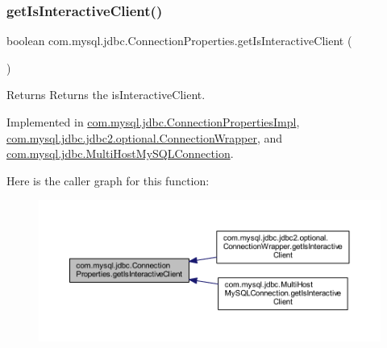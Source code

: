 \subsubsection{\texorpdfstring{get\+Is\+Interactive\+Client()}{getIsInteractiveClient()}}
{\footnotesize\ttfamily boolean com.\+mysql.\+jdbc.\+Connection\+Properties.\+get\+Is\+Interactive\+Client (\begin{DoxyParamCaption}{ }\end{DoxyParamCaption})}

\begin{DoxyReturn}{Returns}
Returns the is\+Interactive\+Client. 
\end{DoxyReturn}


Implemented in \mbox{\hyperlink{classcom_1_1mysql_1_1jdbc_1_1_connection_properties_impl_a236a7d697cdcd98a0afd4cb62118ddb2}{com.\+mysql.\+jdbc.\+Connection\+Properties\+Impl}}, \mbox{\hyperlink{classcom_1_1mysql_1_1jdbc_1_1jdbc2_1_1optional_1_1_connection_wrapper_ae1fd8eb0bb01d247ca9db06d0fb3377f}{com.\+mysql.\+jdbc.\+jdbc2.\+optional.\+Connection\+Wrapper}}, and \mbox{\hyperlink{classcom_1_1mysql_1_1jdbc_1_1_multi_host_my_s_q_l_connection_a49aeeb12ed118d916aaba4f6144ce24d}{com.\+mysql.\+jdbc.\+Multi\+Host\+My\+S\+Q\+L\+Connection}}.

Here is the caller graph for this function\+:\nopagebreak
\begin{figure}[H]
\begin{center}
\leavevmode
\includegraphics[width=350pt]{interfacecom_1_1mysql_1_1jdbc_1_1_connection_properties_a691575c40598ee5b000bed491d3ef096_icgraph}
\end{center}
\end{figure}
\mbox{\label{interfacecom_1_1mysql_1_1jdbc_1_1_connection_properties_a97ae1e1a15afdeb0b6a04efd3d58459e}} 
